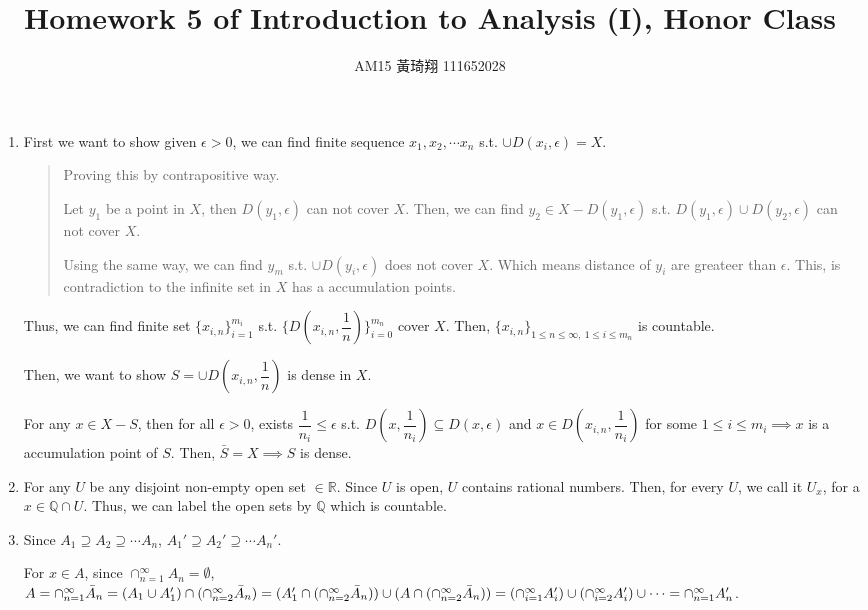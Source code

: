 \documentclass[12pt]{article}
\title{Homework 5 of Introduction to Analysis (I), Honor Class}
\author{AM15 黃琦翔 111652028}
\begin{document}
\maketitle
\begin{enumerate}
    \item First we want to show given $\epsilon > 0$, we can find finite sequence $x_1, x_2, \cdots x_n$ s.t. $\cup D(x_i, \epsilon) = X$.
    \begin{quote}
        Proving this by contrapositive way.

        Let $y_1$ be a point in $X$, then $D(y_1, \epsilon)$ can not cover $X$.
        Then, we can find $y_2\in X-D(y_1, \epsilon)$ s.t. $D(y_1, \epsilon) \cup D(y_2, \epsilon)$ can not cover $X$.

        Using the same way, we can find $y_m$ s.t. $\cup D(y_i, \epsilon)$ does not cover $X$. Which means distance of $y_i$ are greateer than $\epsilon$.
        This, is contradiction to the infinite set in $X$ has a accumulation points.
    \end{quote} 

    Thus, we can find finite set $\lbrace x_{i, n}\rbrace_{i=1}^{m_i}$ s.t. $\lbrace D(x_{i, n}, \dfrac{1}{n})\rbrace_{i=0}^{m_n}$ cover $X$.
    Then, $\lbrace x_{i, n}\rbrace_{1\leq n\leq \infty,\ 1\leq i\leq m_n}$ is countable.

    Then, we want to show $S= \cup D(x_{i, n}, \dfrac{1}{n})$ is dense in $X$.

    For any $x\in X-S$, then for all $\epsilon > 0$, exists $\dfrac{1}{n_i} \leq \epsilon$ s.t. $D(x, \dfrac{1}{n_i})\subseteq D(x, \epsilon)$ and
    $x \in D(x_{i, n}, \dfrac{1}{n_i})$ for some $1\leq i \leq m_i\implies x$ is a accumulation point of $S$. Then, $\bar{S} = X\implies S$ is dense.


    \item For any $U$ be any disjoint non-empty open set $\in \mathbb{R}$.
    Since $U$ is open, $U$ contains rational numbers.
    Then, for every $U$, we call it $U_x$, for a $x\in \mathbb{Q} \cap U$.
    Thus, we can label the open sets by $\mathbb{Q}$ which is countable.

    \newpage
    \item Since $A_1 \supseteq A_2\supseteq \cdots A_n$, $A_1' \supseteq A_2'\supseteq \cdots A_n'$.
    
    For $x \in A$, since $\cap_{n=1}^{\infty} A_n = \emptyset$, $A = \cap_{n=1}^{\infty} \bar{A}_n = (A_1\cup A_1') \cap (\cap_{n=2}^{\infty} \bar{A}_n)\\
    = (A_1' \cap (\cap_{n=2}^{\infty} \bar{A}_n)) \cup (A \cap (\cap_{n=2}^{\infty} \bar{A}_n)) = (\cap_{i=1}^{\infty} A_i') \cup (\cap_{i=2}^{\infty} A_i') \cup \cdots = \cap_{n=1}^{\infty} A_n'$.
    

\end{enumerate}
\end{document}
